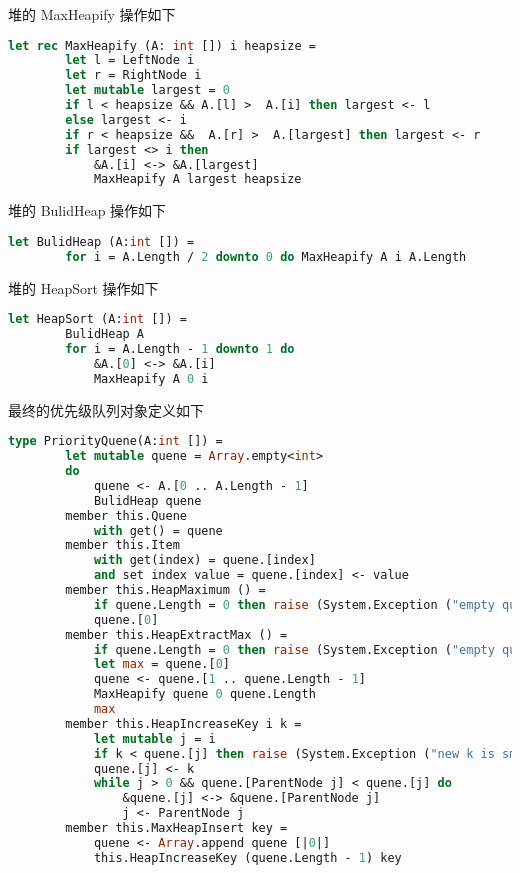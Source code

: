 \documentclass[a4paper]{article}
\begin{document}
堆的 MaxHeapify 操作如下

\begin{lstlisting}[language=ML]
    let rec MaxHeapify (A: int []) i heapsize =
        let l = LeftNode i
        let r = RightNode i
        let mutable largest = 0
        if l < heapsize && A.[l] >  A.[i] then largest <- l
        else largest <- i
        if r < heapsize &&  A.[r] >  A.[largest] then largest <- r
        if largest <> i then 
            &A.[i] <-> &A.[largest]
            MaxHeapify A largest heapsize
\end{lstlisting}

堆的 BulidHeap 操作如下

\begin{lstlisting}[language=ML]
    let BulidHeap (A:int []) =
        for i = A.Length / 2 downto 0 do MaxHeapify A i A.Length
\end{lstlisting}

堆的 HeapSort 操作如下

\begin{lstlisting}[language=ML]
    let HeapSort (A:int []) = 
        BulidHeap A
        for i = A.Length - 1 downto 1 do
            &A.[0] <-> &A.[i]
            MaxHeapify A 0 i
\end{lstlisting}

最终的优先级队列对象定义如下

\begin{lstlisting}[language=ML]
    type PriorityQuene(A:int []) = 
        let mutable quene = Array.empty<int>
        do
            quene <- A.[0 .. A.Length - 1]
            BulidHeap quene
        member this.Quene 
            with get() = quene
        member this.Item
            with get(index) = quene.[index]
            and set index value = quene.[index] <- value
        member this.HeapMaximum () = 
            if quene.Length = 0 then raise (System.Exception ("empty quene"))
            quene.[0]
        member this.HeapExtractMax () = 
            if quene.Length = 0 then raise (System.Exception ("empty quene"))
            let max = quene.[0]
            quene <- quene.[1 .. quene.Length - 1]
            MaxHeapify quene 0 quene.Length
            max
        member this.HeapIncreaseKey i k =
            let mutable j = i
            if k < quene.[j] then raise (System.Exception ("new k is smaller than curren key"))
            quene.[j] <- k
            while j > 0 && quene.[ParentNode j] < quene.[j] do
                &quene.[j] <-> &quene.[ParentNode j]
                j <- ParentNode j
        member this.MaxHeapInsert key = 
            quene <- Array.append quene [|0|]
            this.HeapIncreaseKey (quene.Length - 1) key
\end{lstlisting}
\end{document}
